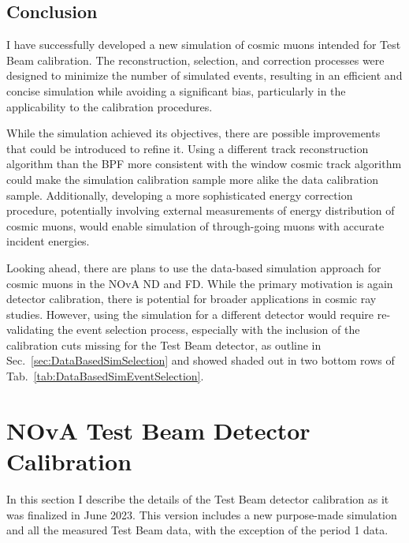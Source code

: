 \subsection{Conclusion}

I have successfully developed a new simulation of cosmic muons intended for Test Beam calibration. The reconstruction, selection, and correction processes were designed to minimize the number of simulated events, resulting in an efficient and concise simulation while avoiding a significant bias, particularly in the applicability to the calibration procedures.

While the simulation achieved its objectives, there are possible improvements that could be introduced to refine it. Using a different track reconstruction algorithm than the \gls{BPF} more consistent with the window cosmic track algorithm could make the simulation calibration sample more alike the data calibration sample. Additionally, developing a more sophisticated energy correction procedure, potentially involving external measurements of energy distribution of cosmic muons, would enable simulation of through-going muons with accurate incident energies.

Looking ahead, there are plans to use the data-based simulation approach for cosmic muons in the \gls{NOvA} \gls{ND} and \gls{FD}. While the primary motivation is again detector calibration, there is potential for broader applications in cosmic ray studies. However, using the simulation for a different detector would require re-validating the event selection process, especially with the inclusion of the calibration cuts missing for the Test Beam detector, as outline in Sec.~\ref{sec:DataBasedSimSelection} and showed shaded out in two bottom rows of Tab.~\ref{tab:DataBasedSimEventSelection}.

\section{NOvA Test Beam Detector Calibration}\label{sec:TBCalibrationSection}
In this section I describe the details of the Test Beam detector calibration as it was finalized in June 2023. This version includes a new purpose-made simulation and all the measured Test Beam data, with the exception of the period 1 data.


